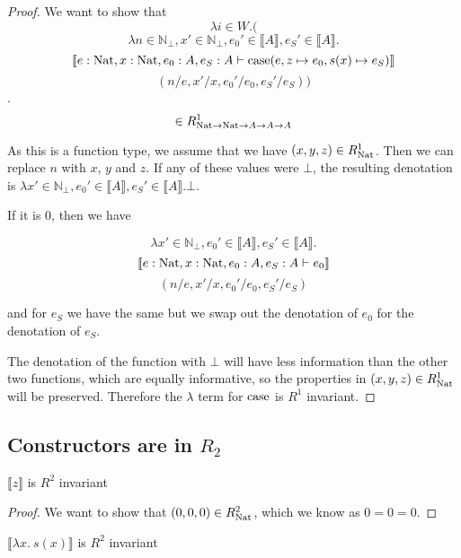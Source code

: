 \begin{proof}

 We want to show that 
 \[ \lambda i \in W. (\]
\[\lambda n \in \mathbb{N}_{\bot}, x' \in \mathbb{N}_{\bot}, e_0' \in \llbracket A \rrbracket ,  e_S' \in \llbracket A \rrbracket .\]
\[ \llbracket e : \operatorname{Nat}, x : \operatorname{Nat}, e_0 : A , e_S : A \vdash \operatorname{case} (e, z \mapsto e_0, s(x) \mapsto e_S) \rrbracket\]
\[ (n/e, x'/x, e_0'/e_0, e_S'/e_S))\].
\[ \in R_{\operatorname{Nat} \to \operatorname{Nat} \to A \to A \to A}^1\]

As this is a function type, we assume that we have $(x,y,z) \in R_{\operatorname{Nat}}^1$. Then we can replace $n$ with $x$, $y$ and $z$. If any of these values were $\bot$, the resulting denotation is $\lambda x' \in \mathbb{N}_{\bot}, e_0' \in \llbracket A \rrbracket ,  e_S' \in \llbracket A \rrbracket . \bot$.

If it is $0$, then we have 

\[ \lambda x' \in \mathbb{N}_{\bot}, e_0' \in \llbracket A \rrbracket ,  e_S' \in \llbracket A \rrbracket .\] \[\llbracket e : \operatorname{Nat}, x : \operatorname{Nat}, e_0 : A , e_S : A \vdash e_0 \rrbracket\]
\[ (n/e, x'/x, e_0'/e_0, e_S'/e_S)\]

and for $e_S$ we have the same but we swap out the denotation of $e_0$ for the denotation of $e_S$.

The denotation of the function with $\bot$ will have less information than the other two functions, which are equally informative, so the properties in $(x,y,z) \in R_{\operatorname{Nat}}^1$ will be preserved. Therefore the $\lambda$ term for $\operatorname{case}$ is $R^1$ invariant.
\end{proof}



\subsection{Constructors are in $R_2$}

\begin{lem}
$\llbracket z \rrbracket$ is $R^2$ invariant
\end{lem}

\vspace{0.25cm}

\begin{proof}
We want to show that $(0,0,0) \in R_{\operatorname{Nat}}^2$, which we know as $0=0=0$.
\end{proof}

\vspace{0.5cm}

\begin{lem}
$\llbracket \lambda x . \ s(x) \rrbracket$ is $R^2$ invariant
\end{lem}

